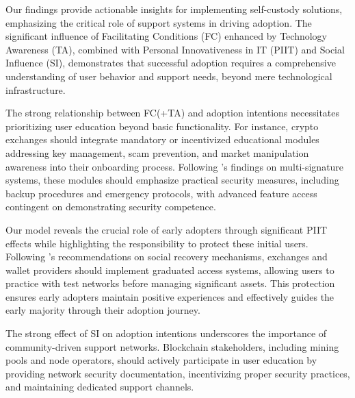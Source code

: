 \documentclass[twocolumn]{article}
\begin{document}
Our findings provide actionable insights for implementing self-custody solutions, emphasizing the critical role of support systems in driving adoption. The significant influence of Facilitating Conditions (FC) enhanced by Technology Awareness (TA), combined with Personal Innovativeness in IT (PIIT) and Social Influence (SI), demonstrates that successful adoption requires a comprehensive understanding of user behavior and support needs, beyond mere technological infrastructure.

The strong relationship between FC(+TA) and adoption intentions necessitates prioritizing user education beyond basic functionality. For instance, crypto exchanges should integrate mandatory or incentivized educational modules addressing key management, scam prevention, and market manipulation awareness into their onboarding process. Following \textcite{di_nicola_resilient_2020}'s findings on multi-signature systems, these modules should emphasize practical security measures, including backup procedures and emergency protocols, with advanced feature access contingent on demonstrating security competence.

Our model reveals the crucial role of early adopters through significant PIIT effects while highlighting the responsibility to protect these initial users. Following \textcite{buterin_why_2021}'s recommendations on social recovery mechanisms, exchanges and wallet providers should implement graduated access systems, allowing users to practice with test networks before managing significant assets. This protection ensures early adopters maintain positive experiences and effectively guides the early majority through their adoption journey.

The strong effect of SI on adoption intentions underscores the importance of community-driven support networks. Blockchain stakeholders, including mining pools and node operators, should actively participate in user education by providing network security documentation, incentivizing proper security practices, and maintaining dedicated support channels.
\end{document}
